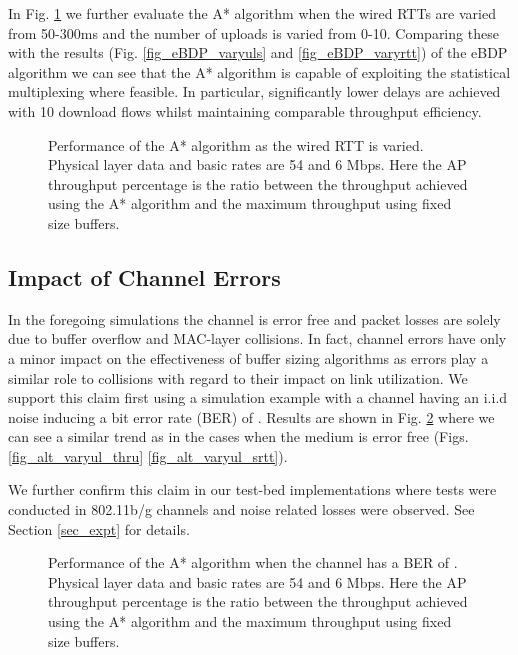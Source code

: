 \documentclass[10pt,twocolumn, journal]{IEEEtran}
\begin{document}
In Fig. \ref{fig_alt_rtt} we further evaluate the
A* algorithm when the wired RTTs are varied from 50-300ms and the number of uploads is varied
from 0-10. Comparing these with the results (Fig. \ref{fig_eBDP_varyuls} and
\ref{fig_eBDP_varyrtt}) of the eBDP algorithm we can see that the A* algorithm is capable
of exploiting the statistical multiplexing where feasible. In particular, significantly
lower delays are achieved with 10 download flows whilst maintaining comparable throughput
efficiency.

\begin{figure}[tb]
   \centering
   \caption{Performance of the A* algorithm as the wired RTT is varied. Physical layer data and basic rates are 54 and 6 Mbps. Here the AP throughput percentage is the ratio between the throughput achieved using the A* algorithm and the maximum throughput using fixed size buffers.}
   \label{fig_alt_rtt}
\end{figure}


\subsection{Impact of Channel Errors}
In the foregoing simulations the channel is error free and packet losses are solely due to buffer overflow and MAC-layer collisions.  In fact, channel errors have only a minor impact on the effectiveness of buffer sizing algorithms as errors play a similar role to collisions with regard to their impact on link utilization. We support this claim first using a simulation example with a channel having an i.i.d noise inducing a bit error rate (BER) of .  Results are shown in Fig. \ref{fig_channelerror} where we can see a similar trend as in the cases when the medium is error free (Figs. \ref{fig_alt_varyul_thru} \ref{fig_alt_varyul_srtt}).

We further confirm this claim in our test-bed implementations where tests were conducted in 802.11b/g channels and noise related losses were observed. See Section \ref{sec_expt} for details.

\begin{figure}[tb]
   \centering
   \caption{Performance of the A* algorithm when the channel has a BER of . Physical layer data and basic rates are 54 and 6 Mbps. Here the AP throughput percentage is the ratio between the throughput achieved using the A* algorithm and the maximum throughput using fixed size buffers.}
   \label{fig_channelerror}
\end{figure}
\end{document}
